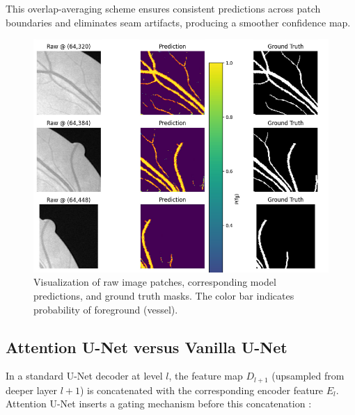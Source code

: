 \documentclass[11pt]{article}
\begin{document}
This overlap-averaging scheme ensures consistent predictions across patch boundaries and eliminates seam artifacts, producing a smoother confidence map.

\begin{figure}[h!]
    \centering
    \includegraphics[scale=0.2]{figure_patches_raw_pred_gt.png}
    \caption{Visualization of raw image patches, corresponding model predictions, and ground truth masks. The color bar indicates probability of foreground (vessel).}
    \label{fig:patches_raw_pred_gt}
\end{figure}


\subsection{Attention U-Net versus Vanilla U-Net}
\label{sec:Attention}
In a standard U-Net decoder at level $l$, the feature map $D_{l+1}$ (upsampled from deeper layer $l+1$) is concatenated with the corresponding encoder feature $E_{l}$. Attention U-Net inserts a gating mechanism before this concatenation \cite{oktay2018attention}: 
\end{document}
